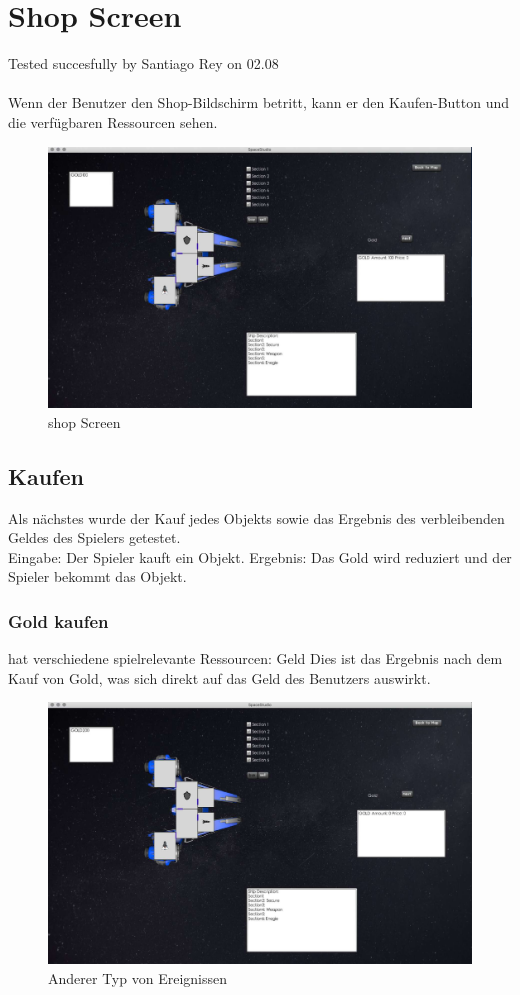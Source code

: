 \documentclass[12pt]{article}
\begin{document}
\section{Shop Screen}
Tested succesfully by Santiago Rey on 02.08\\\\
Wenn der Benutzer den Shop-Bildschirm betritt, kann er den Kaufen-Button und die verfügbaren Ressourcen sehen.
\begin{figure}[h]
\centering
\includegraphics[scale=0.4]{TestProtocolBilder/shopScreen.jpg}
\caption{shop Screen}
\end{figure}

\subsection{Kaufen}
Als nächstes wurde der Kauf jedes Objekts sowie das Ergebnis des verbleibenden Geldes des Spielers getestet.\\
Eingabe: Der Spieler kauft ein Objekt.
Ergebnis: Das Gold wird reduziert und der Spieler bekommt das Objekt.
\subsubsection{Gold kaufen}
hat verschiedene spielrelevante Ressourcen: Geld
Dies ist das Ergebnis nach dem Kauf von Gold, was sich direkt auf das Geld des Benutzers auswirkt.
\begin{figure}[htp]
\centering
\includegraphics[scale=0.4]{TestProtocolBilder/goldgekauft.jpg}
\caption{Anderer Typ von Ereignissen}
\end{figure}
\newpage
\end{document}
